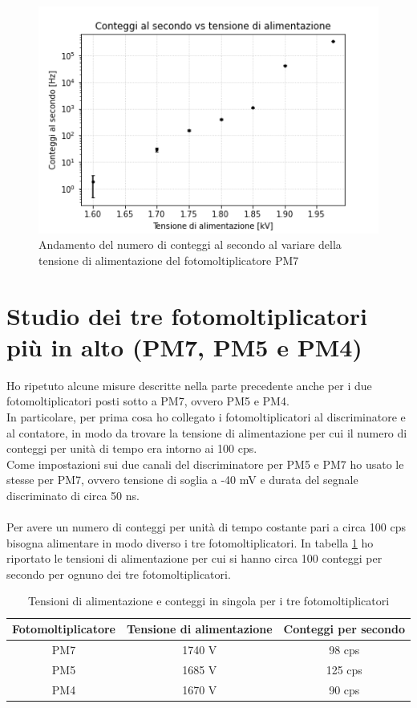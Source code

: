 \documentclass{article}
\begin{document}
\begin{figure}[h]
\begin{center}
\includegraphics[scale=0.9]{Grafici/conteggi_vs_alimentazione.png}
\caption{Andamento del numero di conteggi al secondo al variare della tensione di alimentazione del fotomoltiplicatore PM7} \label{f2}
\end{center}
\end{figure}


\section{Studio dei tre fotomoltiplicatori più in alto (PM7, PM5 e PM4)}
Ho ripetuto alcune misure descritte nella parte precedente anche per i due fotomoltiplicatori posti sotto a PM7, ovvero PM5 e PM4. \\
In particolare, per prima cosa ho collegato i fotomoltiplicatori al discriminatore e al contatore, in modo da trovare la tensione di alimentazione per cui il numero di conteggi  per unità di tempo era intorno ai 100 cps.
\\
Come impostazioni sui due canali del discriminatore per PM5 e PM7 ho usato le stesse per PM7, ovvero tensione di soglia a -40 mV e durata del segnale discriminato di circa 50 ns. 
\\
\\
Per avere un numero di conteggi per unità di tempo costante pari a circa 100 cps bisogna alimentare in modo diverso i tre fotomoltiplicatori. In tabella \ref{tab2} ho riportato le tensioni di alimentazione per cui si hanno circa 100 conteggi per secondo per ognuno dei tre fotomoltiplicatori. 
\begin{table}[h!]
    \centering
    \begin{tabular}{|c|c|c|}
        \hline
        Fotomoltiplicatore & Tensione di alimentazione & Conteggi per secondo\\
        \hline
            PM7 & 1740 V& 98 cps   \\
            PM5 &  1685 V& 125 cps  \\
            PM4 & 1670 V& 90 cps \\
        \hline
    \end{tabular}
    \caption{Tensioni di alimentazione e conteggi in singola per i tre fotomoltiplicatori}
    \label{tab2}
\end{table}
\end{document}
